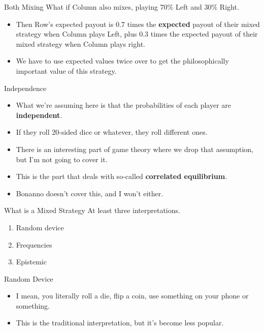 \documentclass[
  ignorenonframetext,
]{beamer}
\providecommand{\tightlist}{%
  \setlength{\itemsep}{0pt}\setlength{\parskip}{0pt}}
\begin{document}
\begin{frame}{Both Mixing}
\protect\hypertarget{both-mixing}{}
What if Column also mixes, playing 70\% Left and 30\% Right.

\begin{itemize}
\tightlist
\item
  Then Row's expected payout is 0.7 times the \textbf{expected} payout
  of their mixed strategy when Column plays Left, plus 0.3 times the
  expected payout of their mixed strategy when Column plays right.
\item
  We have to use expected values twice over to get the philosophically
  important value of this strategy.
\end{itemize}
\end{frame}

\begin{frame}{Independence}
\protect\hypertarget{independence}{}
\begin{itemize}
\tightlist
\item
  What we're assuming here is that the probabilities of each player are
  \textbf{independent}.
\item
  If they roll 20-sided dice or whatever, they roll different ones.
\item
  There is an interesting part of game theory where we drop that
  assumption, but I'm not going to cover it.
\item
  This is the part that deals with so-called \textbf{correlated
  equilibrium}.
\item
  Bonanno doesn't cover this, and I won't either.
\end{itemize}
\end{frame}

\begin{frame}{What is a Mixed Strategy}
\protect\hypertarget{what-is-a-mixed-strategy}{}
At least three interpretations.

\begin{enumerate}
\tightlist
\item
  Random device
\item
  Frequencies
\item
  Epistemic
\end{enumerate}
\end{frame}

\begin{frame}{Random Device}
\protect\hypertarget{random-device}{}
\begin{itemize}
\tightlist
\item
  I mean, you literally roll a die, flip a coin, use something on your
  phone or something.
\item
  This is the traditional interpretation, but it's become less popular.
\end{itemize}
\end{frame}
\end{document}
